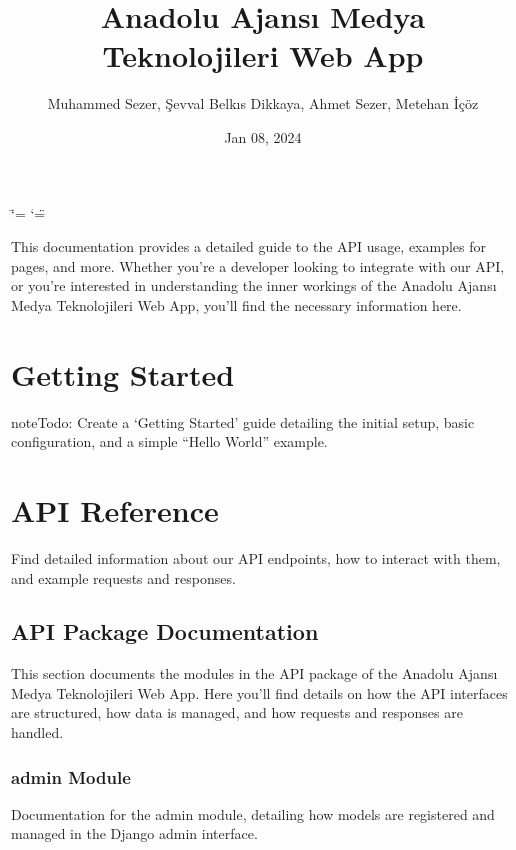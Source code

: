 \documentclass[letterpaper,10pt,english]{sphinxmanual}
\title{Anadolu Ajansı Medya Teknolojileri Web App}
\date{Jan 08, 2024}
\author{Muhammed Sezer, Şevval Belkıs Dikkaya, Ahmet Sezer, Metehan İçöz}
\begin{document}
\ifdefined\shorthandoff
  \ifnum\catcode`\=\string=\active\shorthandoff{=}\fi
  \ifnum\catcode`\"=\active{}\fi
\fi

\pagestyle{empty}
\sphinxmaketitle
\pagestyle{plain}
\sphinxtableofcontents
\pagestyle{normal}
\label{\detokenize{index::doc}}


\sphinxAtStartPar
This documentation provides a detailed guide to the API usage, examples for pages, and more. Whether you’re a developer looking to integrate with our API, or you’re interested in understanding the inner workings of the Anadolu Ajansı Medya Teknolojileri Web App, you’ll find the necessary information here.


\chapter{Getting Started}
\label{\detokenize{index:getting-started}}
\begin{sphinxadmonition}{note}{\label{\detokenize{index:id1}}Todo:}
\sphinxAtStartPar
Create a ‘Getting Started’ guide detailing the initial setup, basic configuration, and a simple “Hello World” example.
\end{sphinxadmonition}


\chapter{API Reference}
\label{\detokenize{index:api-reference}}
\sphinxAtStartPar
Find detailed information about our API endpoints, how to interact with them, and example requests and responses.

\sphinxstepscope


\section{API Package Documentation}
\label{\detokenize{source/api:api-package-documentation}}\label{\detokenize{source/api::doc}}
\sphinxAtStartPar
This section documents the modules in the API package of the Anadolu Ajansı Medya Teknolojileri Web App. Here you’ll find details on how the API interfaces are structured, how data is managed, and how requests and responses are handled.


\subsection{admin Module}
\label{\detokenize{source/api:admin-module}}
\sphinxAtStartPar
Documentation for the admin module, detailing how models are registered and managed in the Django admin interface.
\label{\detokenize{source/api:module-api.admin}}
\end{document}
